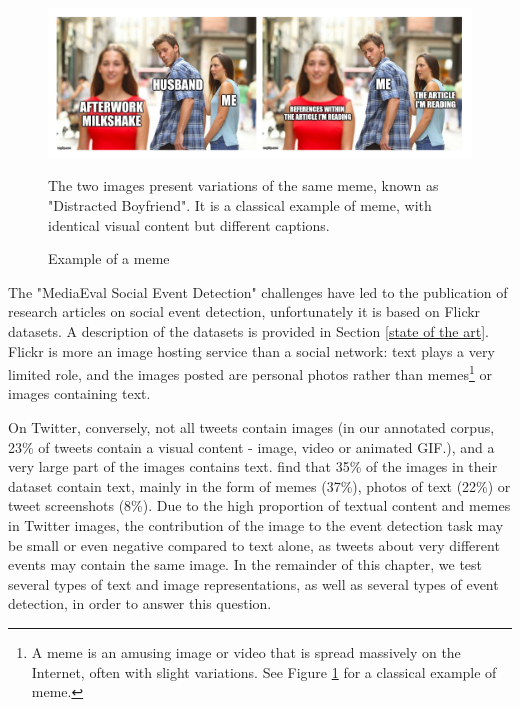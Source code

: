 \begin{figure}
\begin{center}
\includegraphics[width=1\textwidth]{figures/distracted_boyfriend.png}
\end{center}
{\scriptsize The two images present variations of the same meme, known as "Distracted Boyfriend". It is a classical example of meme, with identical visual content but different captions.
}
\caption{Example of a meme}
\label{Figure:meme}
\end{figure}

The "MediaEval Social Event Detection" challenges \cite{reuter2013social, petkos2014social} have led to the publication of research articles on social event detection, unfortunately it is based on Flickr datasets. A description of the datasets is provided in Section \ref{state of the art}. Flickr is more an image hosting service than a social network: text plays a very limited role, and the images posted are personal photos rather than memes\footnote{A meme is an amusing image or video that is spread massively on the Internet, often with slight variations. See Figure \ref{Figure:meme} for a classical example of meme.} or images containing text.  

On Twitter, conversely, not all tweets contain images (in our annotated corpus, 23\% of tweets contain a visual
content - image, video or animated GIF.), and a very large part of the images contains text. \citet{chen2016context} find that 35\% of the images in their dataset contain text, mainly in the form of memes (37\%), photos of text (22\%) or tweet screenshots (8\%). Due to the high proportion of textual content and memes in Twitter images, the contribution of the image to the event detection task may be small or even negative compared to text alone, as tweets about very different events may contain the same image. In the remainder of this chapter, we test several types of text and image representations, as well as several types of event detection, in order to answer this question.

